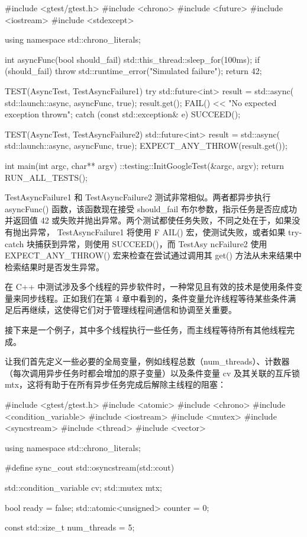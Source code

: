 \begin{cpp}
#include <gtest/gtest.h>
#include <chrono>
#include <future>
#include <iostream>
#include <stdexcept>

using namespace std::chrono_literals;

int asyncFunc(bool should_fail) {
    std::this_thread::sleep_for(100ms);
    if (should_fail) {
        throw std::runtime_error("Simulated failure");
    }
    return 42;
}

TEST(AsyncTest, TestAsyncFailure1) {
    try {
        std::future<int> result = std::async(
                                std::launch::async,
                                asyncFunc, true);
        result.get();
        FAIL() << "No expected exception thrown";
    } catch (const std::exception& e) {
        SUCCEED();
    }
}

TEST(AsyncTest, TestAsyncFailure2) {
    std::future<int> result = std::async(
                            std::launch::async,
                            asyncFunc, true);
    EXPECT_ANY_THROW(result.get());
}

int main(int argc, char** argv) {
    ::testing::InitGoogleTest(&argc, argv);
    return RUN_ALL_TESTS();
}
\end{cpp}

TestAsyncFailure1 和 TestAsyncFailure2 测试非常相似。两者都异步执行 asyncFunc() 函数，该函数现在接受 should\_fail 布尔参数，指示任务是否应成功并返回值 42 或失败并抛出异常。两个测试都使任务失败，不同之处在于，如果没有抛出异常， TestAsyncFailure1 将使用 F AIL() 宏，使测试失败，或者如果 try-catch 块捕获到异常，则使用 SUCCEED()，而 TestAsy ncFailure2 使用 EXPECT\_ANY\_THROW() 宏来检查在尝试通过调用其 get() 方法从未来结果中检索结果时是否发生异常。


在 C++ 中测试涉及多个线程的异步软件时，一种常见且有效的技术是使用条件变量来同步线程。正如我们在第 4 章中看到的，条件变量允许线程等待某些条件满足后再继续，这使得它们对于管理线程间通信和协调至关重要。

接下来是一个例子，其中多个线程执行一些任务，而主线程等待所有其他线程完成。

让我们首先定义一些必要的全局变量，例如线程总数（num\_threads）、计数器（每次调用异步任务时都会增加的原子变量）以及条件变量 cv 及其关联的互斥锁 mtx，这将有助于在所有异步任务完成后解除主线程的阻塞：

\begin{cpp}
#include <gtest/gtest.h>
#include <atomic>
#include <chrono>
#include <condition_variable>
#include <iostream>
#include <mutex>
#include <syncstream>
#include <thread>
#include <vector>

using namespace std::chrono_literals;

#define sync_cout std::osyncstream(std::cout)

std::condition_variable cv;
std::mutex mtx;

bool ready = false;
std::atomic<unsigned> counter = 0;

const std::size_t num_threads = 5;
\end{cpp}

